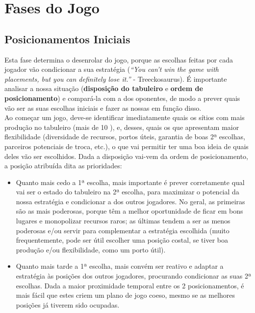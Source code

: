\documentclass[12pt]{article}
\begin{document}
\section{Fases do Jogo}
\subsection{Posicionamentos Iniciais}
Esta fase determina o desenrolar do jogo, porque as escolhas feitas por cada jogador vão condicionar a sua estratégia (\textit{``You can't win the game with placements, but you can definitely lose it.''} - Treeckosaurus).
É importante analisar a nossa situação (\textbf{disposição do tabuleiro} e \textbf{ordem de posicionamento}) e compará-la com a dos oponentes, de modo a prever quais vão ser as suas escolhas iniciais e fazer as nossas em função disso. \\
Ao começar um jogo, deve-se identificar imediatamente quais os sítios com mais produção no tabuleiro (mais de 10 \raisebox{0.2\height}{\textbullet}), e, desses, quais os que apresentam maior flexibilidade (diversidade de recursos, portos úteis, garantia de boas 2ª escolhas, parceiros potenciais de troca, etc.), o que vai permitir ter uma boa ideia de quais deles vão ser escolhidos.
Dada a disposição vai-vem da ordem de posicionamento, a posição atribuída dita as prioridades:
\begin{itemize}
    \item Quanto mais cedo a 1ª escolha, mais importante é prever corretamente qual vai ser o estado do tabuleiro na 2ª escolha, para maximizar o potencial da nossa estratégia e condicionar a dos outros jogadores.
    No geral, as primeiras  são as mais poderosas, porque têm a melhor oportunidade de ficar em bons lugares e monopolizar recursos raros;
    as últimas tendem a ser as menos poderosas e/ou servir para complementar a estratégia escolhida (muito frequentemente, pode ser útil escolher uma posição costal, se tiver boa produção e/ou flexibilidade, como um porto útil).
    \item Quanto mais tarde a 1ª escolha, mais convém ser reativo e adaptar a estratégia às posições dos outros jogadores, procurando condicionar as suas 2ª escolhas.
    Dada a maior proximidade temporal entre os 2 posicionamentos, é mais fácil que estes criem um plano de jogo coeso, mesmo se as melhores posições já tiverem sido ocupadas.
\end{itemize}
\end{document}
